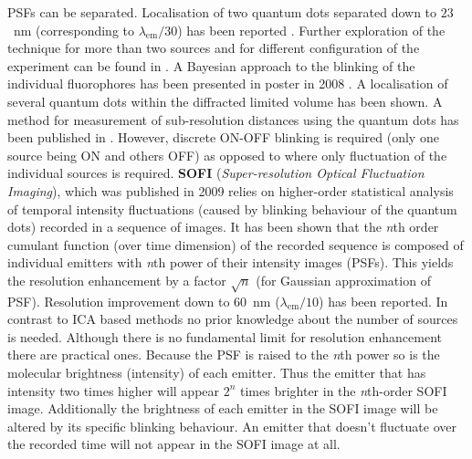 PSFs can be separated. Localisation of two quantum dots separated down to $23$~nm (corresponding to $\lambda_{\mathrm{em}}/30$) has been reported \citep{Lidke2005}. Further exploration of the technique for more than two sources and for different configuration of the experiment can be found in \citep{Lidke2007}. A Bayesian approach to the blinking of the individual fluorophores has been presented in poster in 2008 \citep{Harrington2008}. A localisation of several quantum dots within the diffracted limited volume has been shown. A method for measurement of sub-resolution distances using the quantum dots has been published in \citep{Lagerholm2006}. However, discrete ON-OFF blinking is required (only one source being ON and others OFF) as opposed to \citep{Lidke2005,Harrington2008} where only fluctuation of the individual sources is required. \textbf{SOFI} (\emph{Super-resolution Optical Fluctuation Imaging}), which was published in 2009 \citep{Dertinger2009} relies on higher-order statistical analysis of temporal intensity fluctuations (caused by blinking behaviour of the quantum dots) recorded in a sequence of images. It has been shown that the \emph{n}th order cumulant function (over time dimension) of the recorded sequence is composed of individual emitters with \emph{n}th power of their intensity images (PSFs). This yields the resolution enhancement by a factor $\sqrt{n}$ (for Gaussian approximation of PSF). Resolution improvement down to 60~nm ($\lambda_{\mathrm{em}}/10$) has been reported. In contrast to ICA based methods no prior knowledge about the number of sources is needed. Although there is no fundamental limit for resolution enhancement there are practical ones. Because the PSF is raised to the \emph{n}th power so is the molecular brightness (intensity) of each emitter. Thus the emitter that has intensity two times higher will appear $2^{n}$ times brighter in the \emph{n}th-order SOFI image. Additionally the brightness of each emitter in the SOFI image will be altered by its specific blinking behaviour. An emitter that doesn't fluctuate over the recorded time will not appear in the SOFI image at all.
%

